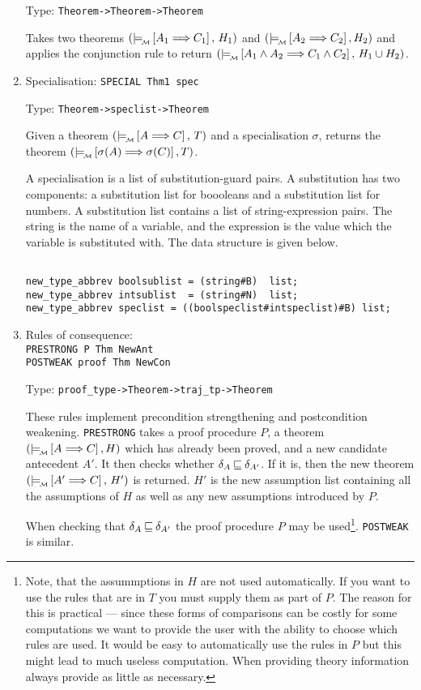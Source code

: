 \begin{enumerate}
Type: {\tt Theorem->Theorem->Theorem}

Takes two theorems $(\models_{\!{\mbox{}_{\cal M}}}\! \left[A_1\Longrightarrow C_1\right],\, H_1)$ and 
$(\models_{\!{\mbox{}_{\cal M}}}\! \left[A_2\Longrightarrow C_2\right], H_2)$ and applies the conjunction rule to
return $(\models_{\!{\mbox{}_{\cal M}}}\! \left[A_1\land A_2\Longrightarrow C_1\land C_2\right],\, H_1\cup H_2)$.

\item Specialisation: {\tt SPECIAL   Thm1  spec}

Type: {\tt Theorem->speclist->Theorem}

Given a theorem $(\models_{\!{\mbox{}_{\cal M}}}\! \left[A\Longrightarrow C\right],\, T)$ and a specialisation
$\sigma$, returns the theorem $(\models_{\!{\mbox{}_{\cal M}}}\! \left[\sigma(A)\Longrightarrow \sigma(C)\right],T)$.

A specialisation is a list of substitution-guard pairs. A
substitution has two components: a substitution list for 
boooleans and a substitution list for numbers. A substitution
list contains a list of string-expression pairs. The string 
is the name of a variable, and the expression is the value which
the variable is substituted with. The data structure is 
given below.

\begin{verbatim}

new_type_abbrev boolsublist = (string#B)  list;
new_type_abbrev intsublist  = (string#N)  list;
new_type_abbrev speclist = ((boolspeclist#intspeclist)#B) list;

\end{verbatim}


\item Rules of consequence:\\
{\tt PRESTRONG P Thm NewAnt\\
POSTWEAK  proof Thm NewCon}

Type: {\tt proof\_type->Theorem->traj\_tp->Theorem}

These rules implement precondition strengthening and postcondition
weakening. {\tt PRESTRONG} takes a proof procedure
$P$, a theorem $(\models_{\!{\mbox{}_{\cal M}}}\! \left[A\Longrightarrow C\right], H)$ which has
already been proved, and a new candidate antecedent $A'$. It then
checks whether $\delta_A \mbox{$\: \sqsubseteq \:$} \delta_{A'}$. If it is, then
the new theorem $(\models_{\!{\mbox{}_{\cal M}}}\! \left[A'\Longrightarrow C\right],\, H')$ is returned. 
$H'$ is the new assumption list containing all the assumptions
of $H$ as well as any new assumptions introduced by $P$.

When checking
that $\delta_A \mbox{$\: \sqsubseteq \:$} \delta_{A'}$ the proof procedure $P$
may be used\footnote{Note, that the assummptions in $H$ are not used
automatically. If you want to use the rules that are in $T$ you
must supply them as part of $P$. The reason for this is
practical --- since these forms of comparisons can be costly
for some computations we want to provide the user with the
ability to choose which rules are used. It would be easy to 
automatically use the rules in $P$ but this might lead to much
useless computation. When providing theory information always
provide as little as necessary.}. {\tt POSTWEAK} is similar.


\end{enumerate}
